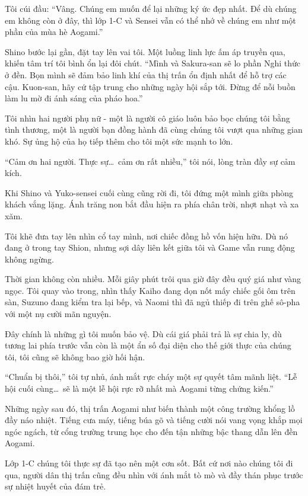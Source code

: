 \documentclass[../main.tex]{subfiles}
\begin{document}
Tôi cúi đầu: ``Vâng. Chúng em muốn để lại những ký ức đẹp nhất. Để dù chúng em không còn ở đây, thì lớp 1-C và Sensei vẫn có thể nhớ về chúng em như một phần của mùa hè Aogami.''

Shino bước lại gần, đặt tay lên vai tôi. Một luồng linh lực ấm áp truyền qua, khiến tâm trí tôi bình ổn lại đôi chút. ``Mình và Sakura-san sẽ lo phần Nghi thức ở đền. Bọn mình sẽ đảm bảo linh khí của thị trấn ổn định nhất để hỗ trợ các cậu. Kuon-san, hãy cứ tập trung cho những ngày hội sắp tới. Đừng để nỗi buồn làm lu mờ đi ánh sáng của pháo hoa.''

Tôi nhìn hai người phụ nữ - một là người cô giáo luôn bảo bọc chúng tôi bằng tình thương, một là người bạn đồng hành đã cùng chúng tôi vượt qua những gian khó. Sự ủng hộ của họ tiếp thêm cho tôi một sức mạnh to lớn.

``Cảm ơn hai người. Thực sự\dots\ cảm ơn rất nhiều,'' tôi nói, lòng tràn đầy sự cảm kích.

Khi Shino và Yuko-sensei cuối cùng cũng rời đi, tôi đứng một mình giữa phòng khách vắng lặng. Ánh trăng non bắt đầu hiện ra phía chân trời, nhợt nhạt và xa xăm.

Tôi khẽ đưa tay lên nhìn cổ tay mình, nơi chiếc đồng hồ vốn hiện hữu. Dù nó đang ở trong tay Shion, nhưng sợi dây liên kết giữa tôi và Game vẫn rung động không ngừng.

Thời gian không còn nhiều. Mỗi giây phút trôi qua giờ đây đều quý giá như vàng ngọc. Tôi quay vào trong, nhìn thấy Kaiho đang dọn nốt mấy chiếc gối ôm trên sàn, Suzuno đang kiểm tra lại bếp, và Naomi thì đã ngủ thiếp đi trên ghế sô-pha với một nụ cười mãn nguyện.

Đây chính là những gì tôi muốn bảo vệ. Dù cái giá phải trả là sự chia ly, dù tương lai phía trước vẫn còn là một ẩn số đại diện cho thế giới thực của chúng tôi, tôi cũng sẽ không bao giờ hối hận.

``Chuẩn bị thôi,'' tôi tự nhủ, ánh mắt rực cháy một sự quyết tâm mãnh liệt. ``Lễ hội cuối cùng\dots\ sẽ là một lễ hội rực rỡ nhất mà Aogami từng chứng kiến.''

\ct

Những ngày sau đó, thị trấn Aogami như biến thành một công trường khổng lồ đầy náo nhiệt. Tiếng cưa máy, tiếng búa gõ và tiếng cười nói vang vọng khắp mọi ngóc ngách, từ cổng trường trung học cho đến tận những bậc thang dẫn lên đền Aogami.

Lớp 1-C chúng tôi thực sự đã tạo nên một cơn sốt. Bất cứ nơi nào chúng tôi đi qua, người dân thị trấn cũng đều nhìn với ánh mắt tò mò và đầy thán phục trước sự nhiệt huyết của đám trẻ.
\end{document}
